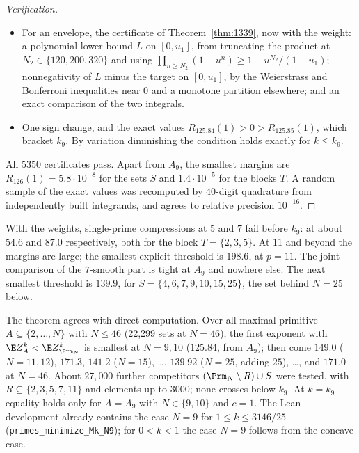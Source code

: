 \begin{proof}[Verification]
\begin{itemize}
\item[(V1)] For an envelope, the certificate of Theorem~\ref{thm:1339}, now with the weight: a
polynomial lower bound $L$ on $[0,u_1]$, from truncating the product at $N_2\in\{120,200,320\}$
and using $\prod_{n\ge N_2}(1-u^n)\ge1-u^{N_2}/(1-u_1)$; nonnegativity of $L$ minus the target
on $[0,u_1]$, by the Weierstrass and Bonferroni inequalities near $0$ and a monotone partition
elsewhere; and an exact comparison of the two integrals.
\item[($A_9$)] One sign change, and the exact values $R_{125.84}(1)>0>R_{125.85}(1)$, which bracket
$k_9$. By variation diminishing the condition holds exactly for $k\le k_9$.
\end{itemize}
All $5350$ certificates pass. Apart from $A_9$, the smallest margins are
$R_{126}(1)=5.8\cdot10^{-8}$ for the sets $S$ and $1.4\cdot10^{-5}$ for the blocks $T$. A random
sample of the exact values was recomputed by $40$-digit quadrature from independently built
integrands, and agrees to relative precision $10^{-16}$.
\end{proof}

\begin{remark}
With the weights, single-prime compressions at $5$ and $7$ fail before $k_9$: at about $54.6$
and $87.0$ respectively, both for the block $T=\{2,3,5\}$. At $11$ and beyond the margins are
large; the smallest explicit threshold is $198.6$, at $p=11$. The joint comparison of the
$7$-smooth part is tight at $A_9$ and nowhere else. The next smallest threshold is $139.9$, for
$S=\{4,6,7,9,10,15,25\}$, the set behind $N=25$ below.
\end{remark}

\begin{remark}
The theorem agrees with direct computation. Over all maximal primitive
$A\subseteq\{2,\dots,N\}$ with $N\le46$ (22{,}299 sets at $N=46$), the first exponent with
$\E Z_A^k<\E Z_{\Prm_N}^k$ is smallest at $N=9,10$ ($125.84$, from $A_9$); then come $149.0$
($N=11,12$), $171.3$, $141.2$ ($N=15$), \dots, $139.92$ ($N=25$, adding $25$), \dots, and
$171.0$ at $N=46$. About $27{,}000$ further competitors $(\Prm_N\setminus R)\cup S$ were tested,
with $R\subseteq\{2,3,5,7,11\}$ and elements up to $3000$; none crosses below $k_9$. At $k=k_9$
equality holds only for $A=A_9$ with $N\in\{9,10\}$ and $c=1$. The Lean development already
contains the case $N=9$ for $1\le k\le3146/25$ (\texttt{primes\_minimize\_Mk\_N9}); for
$0<k<1$ the case $N=9$ follows from the concave case.
\end{remark}
